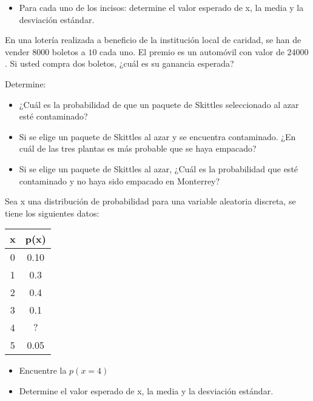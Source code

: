 \documentclass{../oxmathproblems}
\begin{document}
\begin{questions}
\begin{itemize}
\item Para cada uno de los incisos: determine el valor esperado de x, la media y la desviación estándar. 
\end{itemize}


\miquestion En una lotería realizada a beneficio de la institución local de caridad, se han de vender 8000 boletos a $10$ cada uno. El premio es un automóvil con valor de $24 000$. Si usted compra dos boletos, ¿cuál es su ganancia esperada?



Determine: 
\begin{itemize}
\item ¿Cuál es la probabilidad de que un paquete de Skittles seleccionado al azar esté contaminado?
\item Si se elige un paquete de Skittles al azar y se encuentra contaminado. ¿En cuál de las tres plantas es más probable que se haya empacado?
\item Si se elige un paquete de Skittles al azar, ¿Cuál es la probabilidad que esté contaminado y no haya sido empacado en Monterrey?
\end{itemize}


\miquestion Sea x una distribución de probabilidad para una variable aleatoria discreta, se tiene los siguientes datos: 
\begin{tabular}{| c | c |}
\hline
x & p(x) \\ \hline
0 & 0.10 \\ \hline
1 &  0.3 \\ \hline
2 & 0.4 \\ \hline
3 & 0.1 \\ \hline
4 & $?$ \\ \hline
5 & 0.05 \\ \hline
\end{tabular}
\begin{itemize}
\item Encuentre la $p(x=4)$
\item Determine el valor esperado de x, la media y la desviación estándar. 
\end{itemize}





\end{questions}
\end{document}
